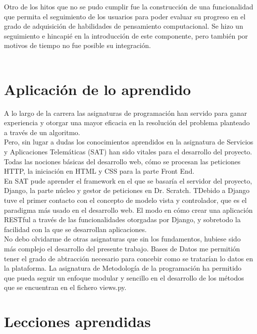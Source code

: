 \documentclass[a4paper, 12pt]{book}
\begin{document}
Otro de los hitos que no se pudo cumplir fue la construcción de una
funcionalidad que permita el seguimiento de los usuarios para poder
evaluar su progreso en el grado de adquisición de habilidades de 
pensamiento computacional. Se hizo un seguimiento e hincapié en la 
introducción de este componente, pero también por motivos de tiempo
no fue posible su integración. \\ \\


\section{Aplicación de lo aprendido}
\label{sec:aplicacion}

A lo largo de la carrera las asignaturas de programación han servido para
ganar experiencia y otorgar una mayor eficacia en la resolución del problema
planteado a través de un algoritmo. \\

Pero, sin lugar a dudas los conocimientos aprendidos en la asignatura de Servicios
y Aplicaciones Telemáticas (SAT) han sido vitales para el desarrollo del 
proyecto. Todas las nociones básicas del desarrollo web, cómo se procesan
las peticiones HTTP, la iniciación en HTML y CSS para la parte Front End. \\


En SAT pude aprender el framework en el que se basaría el servidor del proyecto,
Django, la parte núcleo y gestor de peticiones en Dr. Scratch. TDebido a Django
tuve el primer contacto con el concepto de modelo vista y controlador, 
que es el paradigma más usado en el desarrollo web. El modo en cómo crear una
 aplicación RESTful a través de las funcionalidades otorgadas por Django, y 
sobretodo la facilidad con la que se desarrollan aplicaciones. \\

No debo olvidarme de otras asignaturas que sin los fundamentos, hubiese sido
más complejo el desarrollo del presente trabajo. Bases de Datos me permitión
tener el grado de abtracción necesario para concebir como se tratarían lo datos
en la plataforma. La asignatura de Metodología de la programación ha permitido
que pueda seguir un enfoque modular y sencillo en el desarrollo de los métodos 
que se encuentran en el fichero views.py.
 


\section{Lecciones aprendidas}
\label{sec:lecciones_aprendidas}
\end{document}
